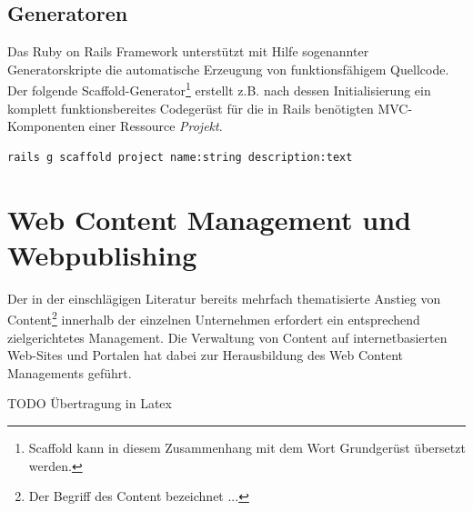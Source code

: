 

\subsection{Generatoren}
\label{sec:railsgeneratoren}
Das Ruby on Rails Framework unterstützt mit Hilfe sogenannter Generatorskripte die automatische Erzeugung von funktionsfähigem Quellcode. Der folgende Scaffold-Generator\footnote{Scaffold kann in diesem Zusammenhang mit dem Wort Grundgerüst übersetzt werden.} erstellt z.B. nach dessen Initialisierung ein komplett funktionsbereites Codegerüst für die in Rails benötigten MVC-Komponenten einer Ressource \emph{Projekt}.

\begin{lstlisting}[caption=Aufruf des Generators zur Erstellung einer MVC-Ressource Projekt]
rails g scaffold project name:string description:text
\end{lstlisting}




\section{Web Content Management und Webpublishing}
\label{sec:webpublishing}
Der in der einschlägigen Literatur bereits mehrfach thematisierte Anstieg von Content\footnote{Der Begriff des Content bezeichnet ...} innerhalb der einzelnen Unternehmen erfordert ein entsprechend zielgerichtetes Management. Die Verwaltung von Content auf internetbasierten Web-Sites und Portalen hat dabei zur Herausbildung des Web Content Managements geführt.


TODO Übertragung in Latex


\newpage

